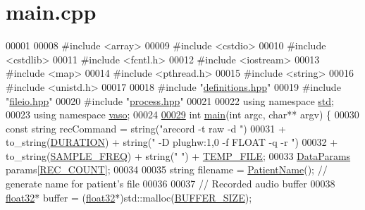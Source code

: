 \hypertarget{main_8cpp_source}{\section{main.\+cpp}
\label{main_8cpp_source}
}

\begin{DoxyCode}
00001 
00008 \textcolor{preprocessor}{#include <array>}
00009 \textcolor{preprocessor}{#include <cstdio>}
00010 \textcolor{preprocessor}{#include <cstdlib>}
00011 \textcolor{preprocessor}{#include <fcntl.h>}
00012 \textcolor{preprocessor}{#include <iostream>}
00013 \textcolor{preprocessor}{#include <map>}
00014 \textcolor{preprocessor}{#include <pthread.h>}
00015 \textcolor{preprocessor}{#include <string>}
00016 \textcolor{preprocessor}{#include <unistd.h>}
00017 
00018 \textcolor{preprocessor}{#include "\hyperlink{definitions_8hpp}{definitions.hpp}"}
00019 \textcolor{preprocessor}{#include "\hyperlink{fileio_8hpp}{fileio.hpp}"}
00020 \textcolor{preprocessor}{#include "\hyperlink{process_8hpp}{process.hpp}"}
00021 
00022 \textcolor{keyword}{using namespace }\hyperlink{namespacestd}{std};
00023 \textcolor{keyword}{using namespace }\hyperlink{namespacevaso}{vaso};
00024 
\hypertarget{main_8cpp_source_l00029}{}\hyperlink{main_8cpp_a3c04138a5bfe5d72780bb7e82a18e627}{00029} \textcolor{keywordtype}{int} \hyperlink{main_8cpp_a3c04138a5bfe5d72780bb7e82a18e627}{main}(\textcolor{keywordtype}{int} argc, \textcolor{keywordtype}{char}** argv) \{
00030     \textcolor{keyword}{const} \textcolor{keywordtype}{string} recCommand = string(\textcolor{stringliteral}{"arecord -t raw -d "})
00031         + to\_string(\hyperlink{definitions_8hpp_ada7a88c013312e76596a2000cc8277fb}{DURATION}) + string(\textcolor{stringliteral}{" -D plughw:1,0 -f FLOAT -q -r "})
00032          + to\_string(\hyperlink{definitions_8hpp_a8ace559345ecba7978591ac2ef22aea4}{SAMPLE\_FREQ}) + string(\textcolor{stringliteral}{" "}) + \hyperlink{definitions_8hpp_a88f32e97c41b89ff0705d0a0b8566b41}{TEMP\_FILE};
00033     \hyperlink{structDataParams}{DataParams} params[\hyperlink{definitions_8hpp_a2fd18fd694a2918f7d73eba821fd10b2}{REC\_COUNT}];
00034 
00035     \textcolor{keywordtype}{string} filename = \hyperlink{namespacevaso_a21e264fa912f7ca3f50e7e412ba1582e}{PatientName}();  \textcolor{comment}{// generate name for patient's file}
00036 
00037     \textcolor{comment}{// Recorded audio buffer}
00038     \hyperlink{definitions_8hpp_aacdc525d6f7bddb3ae95d5c311bd06a1}{float32}* buffer = (\hyperlink{definitions_8hpp_aacdc525d6f7bddb3ae95d5c311bd06a1}{float32}*)std::malloc(\hyperlink{definitions_8hpp_aca681ed285767aaa2353bf3b42dd60ed}{BUFFER\_SIZE});

\end{DoxyCode}
